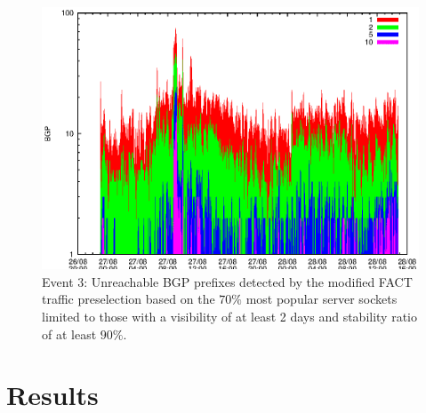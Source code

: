 \begin{figure}
	[p] \centering 
	\includegraphics[width=0.75\linewidth]{images/events/2010_08_27/bgp_log_Set_var_0_1_stab_9_vts_2.eps}
	\caption{Event 3: Unreachable BGP prefixes detected by the modified FACT traffic preselection based on the $70\%$ most popular server sockets limited to those with a visibility of at least 2 days and stability ratio of at least $90\%$.} 
	\label{fig:RIPE_FACT_popularVTS2STAB9} 
\end{figure}

\newpage
\section{Results}

